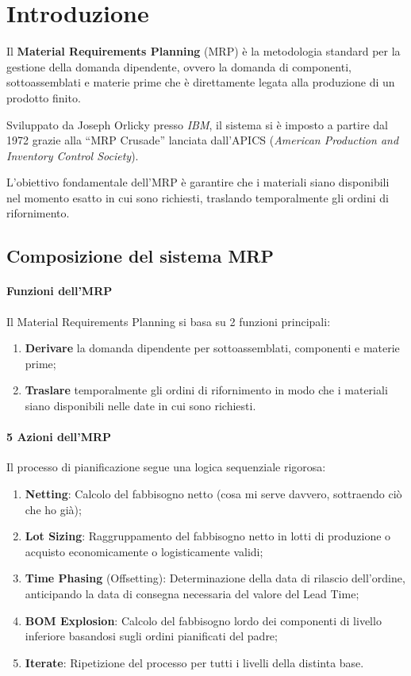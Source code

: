 %
%
\section{Introduzione}
Il \textbf{Material Requirements Planning} (MRP) è la metodologia standard per la gestione della domanda dipendente, ovvero la domanda di componenti, sottoassemblati e materie prime che è direttamente legata alla produzione di un prodotto finito.

Sviluppato da Joseph Orlicky presso \emph{IBM}, il sistema si è imposto a partire dal 1972 grazie alla ``MRP Crusade'' lanciata dall'APICS (\emph{American Production and Inventory Control Society}).

L'obiettivo fondamentale dell'MRP è garantire che i materiali siano disponibili nel momento esatto in cui sono richiesti, traslando temporalmente gli ordini di rifornimento.

%
\subsection{Composizione del sistema MRP}

%
\paragraph{Funzioni dell'MRP}
Il Material Requirements Planning si basa su 2 funzioni principali:
\begin{enumerate}
    \item \textbf{Derivare} la domanda dipendente per sottoassemblati, componenti e materie prime;
    \item \textbf{Traslare} temporalmente gli ordini di rifornimento in modo che i materiali siano disponibili nelle date in cui sono richiesti.
\end{enumerate}


%
\paragraph{5 Azioni dell'MRP}
Il processo di pianificazione segue una logica sequenziale rigorosa:
\begin{enumerate}
    \item \textbf{Netting}: Calcolo del fabbisogno netto (cosa mi serve davvero, sottraendo ciò che ho già);
    \item \textbf{Lot Sizing}: Raggruppamento del fabbisogno netto in lotti di produzione o acquisto economicamente o logisticamente validi;
    \item \textbf{Time Phasing} (Offsetting): Determinazione della data di rilascio dell'ordine, anticipando la data di consegna necessaria del valore del Lead Time;
    \item \textbf{BOM Explosion}: Calcolo del fabbisogno lordo dei componenti di livello inferiore basandosi sugli ordini pianificati del padre;
    \item \textbf{Iterate}: Ripetizione del processo per tutti i livelli della distinta base.
\end{enumerate}
%
